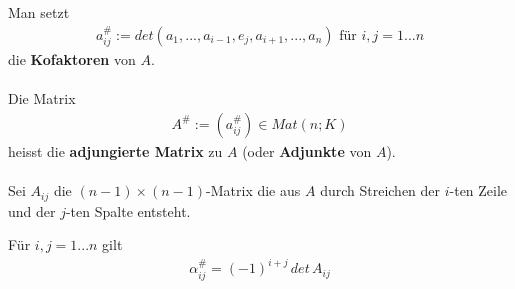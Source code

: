 \documentclass[11pt]{report}
\newcommand*\f[1] {\textbf{#1}}
\begin{document}
Man setzt
\begin{align}
a_{ij}^{\#} := det(a_1, ..., a_{i-1}, e_j, a_{i+1}, ..., a_n) \text{ für } i, j = 1...n
\end{align}
die \f{Kofaktoren} von $A$.\\\\
Die Matrix
\begin{align}
A^{\#} := (a_{ij}^{\#}) \in Mat(n;K)
\end{align}
heisst die \f{adjungierte Matrix} zu $A$ (oder \f{Adjunkte} von $A$).\\\\
Sei $A_{ij}$ die $(n-1) \times (n-1)$-Matrix die aus $A$ durch Streichen der $i$-ten Zeile und der $j$-ten Spalte entsteht.

\begin{lemma}
\label{lemma622}
Für $i,j=1...n$ gilt
\begin{align}
\alpha_{ij}^{\#} = (-1)^{i+j} \,det\, A_{ij}
\end{align}
\end{lemma}
\end{document}
